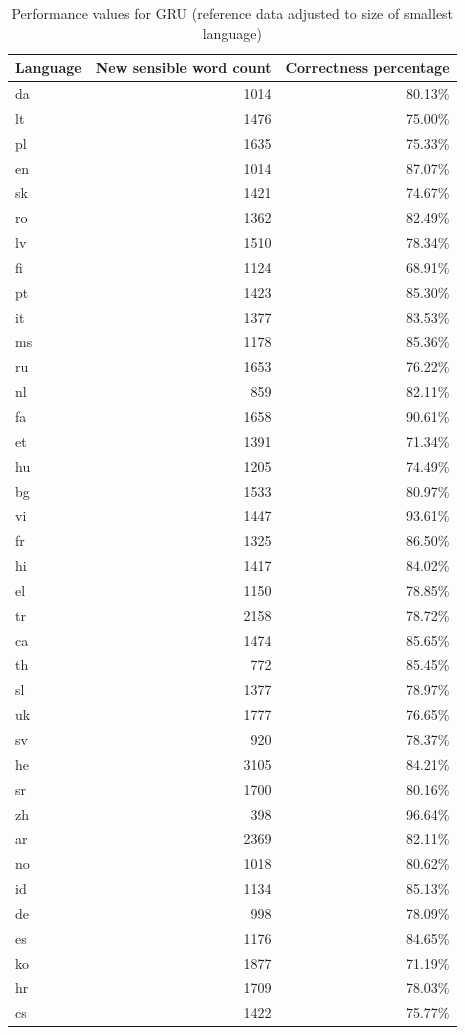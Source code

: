 \documentclass[11pt,a4paper,twoside,openright]{scrbook}
\begin{document}
\begin{table}[h]
\centering
\caption{Performance values for GRU (reference data adjusted to size of smallest language)}
\label{table:gru}
\begin{tabular}{lrr}
\textbf{Language} & \textbf{New sensible word count} & \textbf{Correctness percentage} \\ \hline \hline
da & 1014 & 80.13\% \\ \hline
lt & 1476 & 75.00\% \\ \hline
pl & 1635 & 75.33\% \\ \hline
en & 1014 & 87.07\% \\ \hline
sk & 1421 & 74.67\% \\ \hline
ro & 1362 & 82.49\% \\ \hline
lv & 1510 & 78.34\% \\ \hline
fi & 1124 & 68.91\% \\ \hline
pt & 1423 & 85.30\% \\ \hline
it & 1377 & 83.53\% \\ \hline
ms & 1178 & 85.36\% \\ \hline
ru & 1653 & 76.22\% \\ \hline
nl & 859 & 82.11\% \\ \hline
fa & 1658 & 90.61\% \\ \hline
et & 1391 & 71.34\% \\ \hline
hu & 1205 & 74.49\% \\ \hline
bg & 1533 & 80.97\% \\ \hline
vi & 1447 & 93.61\% \\ \hline
fr & 1325 & 86.50\% \\ \hline
hi & 1417 & 84.02\% \\ \hline
el & 1150 & 78.85\% \\ \hline
tr & 2158 & 78.72\% \\ \hline
ca & 1474 & 85.65\% \\ \hline
th & 772 & 85.45\% \\ \hline
sl & 1377 & 78.97\% \\ \hline
uk & 1777 & 76.65\% \\ \hline
sv & 920 & 78.37\% \\ \hline
he & 3105 & 84.21\% \\ \hline
sr & 1700 & 80.16\% \\ \hline
zh & 398 & 96.64\% \\ \hline
ar & 2369 & 82.11\% \\ \hline
no & 1018 & 80.62\% \\ \hline
id & 1134 & 85.13\% \\ \hline
de & 998 & 78.09\% \\ \hline
es & 1176 & 84.65\% \\ \hline
ko & 1877 & 71.19\% \\ \hline
hr & 1709 & 78.03\% \\ \hline
cs & 1422 & 75.77\% \\
\end{tabular}
\end{table}
\end{document}
